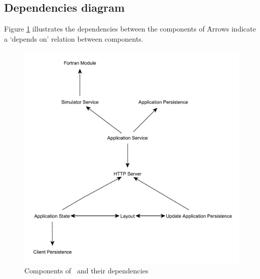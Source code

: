 \subsection{Dependencies diagram}
\label{subsec:depdiag}
Figure \ref{fig:compdependencies} illustrates the dependencies between the components of \projectname\. Arrows indicate a `depends on' relation between components.

\noindent
\begin{figure}[h!b]
	\centering
	\includegraphics[width=\textwidth]{ComponentDependencies}
	\caption{Components of \projectname\ and their dependencies}
	\label{fig:compdependencies}
\end{figure}